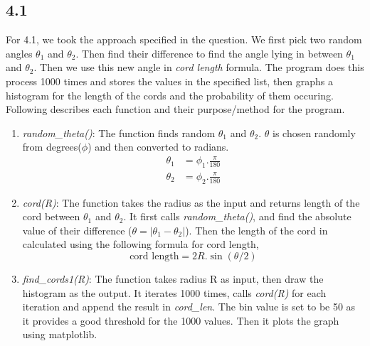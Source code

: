 \documentclass[answers]{exam}
\begin{document}
  \subsection*{4.1}
    \begin{framed}
        For 4.1, we took the approach specified in the question. We first pick two random angles $\theta_1$ and $\theta_2$. Then find their difference to find the angle lying in between $\theta_1$ and $\theta_2$. Then we use this new angle in \emph{cord length} formula. The program does this process 1000 times and stores the values in the specified list, then graphs a histogram for the length of the cords and the probability of them occuring. Following describes each function and their purpose/method for the program.
        \begin{enumerate}
            \item \emph{random\_theta()}: The function finds random $\theta_1$ and $\theta_2$. $\theta$ is chosen randomly from degrees($\phi$) and then converted to radians.
                    \begin{align*}
                        \theta_1 &= \phi_1 . \frac{\pi}{180}\\
                        \theta_2 &= \phi_2 . \frac{\pi}{180}
                    \end{align*}
            \item \emph{cord(R)}: The function takes the radius as the input and returns length of the cord between $\theta_1$ and $\theta_2$. It first calls \emph{random\_theta()}, and find the absolute value of their difference ($\theta=|\theta_1 - \theta_2|$). Then the length of the cord in calculated using the following formula for cord length,
                    $$\text{cord length}=2R.\sin(\theta/2)$$
            \item \emph{find\_cords1(R)}: The function takes radius R as input, then draw the histogram as the output. It iterates 1000 times, calls \emph{cord(R)} for each iteration and append the result in \emph{cord\_len}. The bin value is set to be 50 as it provides a good threshold for the 1000 values. Then it plots the graph using matplotlib.
        \end{enumerate}
    \end{framed}
    
\end{document}
